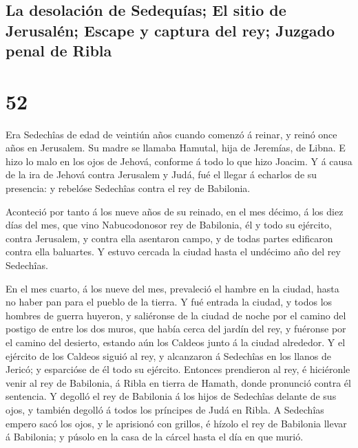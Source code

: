 \hypertarget{la-desolaciuxf3n-de-sedequuxedas-el-sitio-de-jerusaluxe9n-escape-y-captura-del-rey-juzgado-penal-de-ribla}{%
\subsection{La desolación de Sedequías; El sitio de Jerusalén; Escape y
captura del rey; Juzgado penal de
Ribla}\label{la-desolaciuxf3n-de-sedequuxedas-el-sitio-de-jerusaluxe9n-escape-y-captura-del-rey-juzgado-penal-de-ribla}}

\hypertarget{section-24-52}{%
\section{52}\label{section-24-52}}

 Era Sedechîas de edad de veintiún años cuando comenzó á
reinar, y reinó once años en Jerusalem. Su madre se llamaba Hamutal,
hija de Jeremías, de Libna.  E hizo lo malo en los ojos de
Jehová, conforme á todo lo que hizo Joacim.  Y á causa de
la ira de Jehová contra Jerusalem y Judá, fué el llegar á echarlos de su
presencia: y rebelóse Sedechîas contra el rey de Babilonia.

 Aconteció por tanto á los nueve años de su reinado, en el
mes décimo, á los diez días del mes, que vino Nabucodonosor rey de
Babilonia, él y todo su ejército, contra Jerusalem, y contra ella
asentaron campo, y de todas partes edificaron contra ella baluartes.
 Y estuvo cercada la ciudad hasta el undécimo año del rey
Sedechîas.

 En el mes cuarto, á los nueve del mes, prevaleció el
hambre en la ciudad, hasta no haber pan para el pueblo de la tierra.
 Y fué entrada la ciudad, y todos los hombres de guerra
huyeron, y saliéronse de la ciudad de noche por el camino del postigo de
entre los dos muros, que había cerca del jardín del rey, y fuéronse por
el camino del desierto, estando aún los Caldeos junto á la ciudad
alrededor.  Y el ejército de los Caldeos siguió al rey, y
alcanzaron á Sedechîas en los llanos de Jericó; y esparcióse de él todo
su ejército.  Entonces prendieron al rey, é hiciéronle
venir al rey de Babilonia, á Ribla en tierra de Hamath, donde pronunció
contra él sentencia.  Y degolló el rey de Babilonia á los
hijos de Sedechîas delante de sus ojos, y también degolló á todos los
príncipes de Judá en Ribla.  A Sedechîas empero sacó los
ojos, y le aprisionó con grillos, é hízolo el rey de Babilonia llevar á
Babilonia; y púsolo en la casa de la cárcel hasta el día en que murió.

